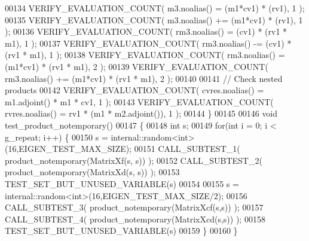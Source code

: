 \begin{DoxyCode}
00134   VERIFY\_EVALUATION\_COUNT( m3.noalias() = (m1*cv1) * (rv1), 1 );
00135   VERIFY\_EVALUATION\_COUNT( m3.noalias() += (m1*cv1) * (rv1), 1 );
00136   VERIFY\_EVALUATION\_COUNT( rm3.noalias() = (cv1) * (rv1 * m1), 1 );
00137   VERIFY\_EVALUATION\_COUNT( rm3.noalias() -= (cv1) * (rv1 * m1), 1 );
00138   VERIFY\_EVALUATION\_COUNT( rm3.noalias() = (m1*cv1) * (rv1 * m1), 2 );
00139   VERIFY\_EVALUATION\_COUNT( rm3.noalias() += (m1*cv1) * (rv1 * m1), 2 );
00140 
00141   \textcolor{comment}{// Check nested products}
00142   VERIFY\_EVALUATION\_COUNT( cvres.noalias() = m1.adjoint() * m1 * cv1, 1 );
00143   VERIFY\_EVALUATION\_COUNT( rvres.noalias() = rv1 * (m1 * m2.adjoint()), 1 );
00144 \}
00145 
00146 \textcolor{keywordtype}{void} test\_product\_notemporary()
00147 \{
00148   \textcolor{keywordtype}{int} s;
00149   \textcolor{keywordflow}{for}(\textcolor{keywordtype}{int} i = 0; i < g\_repeat; i++) \{
00150     s = internal::random<int>(16,EIGEN\_TEST\_MAX\_SIZE);
00151     CALL\_SUBTEST\_1( product\_notemporary(MatrixXf(s, s)) );
00152     CALL\_SUBTEST\_2( product\_notemporary(MatrixXd(s, s)) );
00153     TEST\_SET\_BUT\_UNUSED\_VARIABLE(s)
00154     
00155     s = internal::random<int>(16,EIGEN\_TEST\_MAX\_SIZE/2);
00156     CALL\_SUBTEST\_3( product\_notemporary(MatrixXcf(s,s)) );
00157     CALL\_SUBTEST\_4( product\_notemporary(MatrixXcd(s,s)) );
00158     TEST\_SET\_BUT\_UNUSED\_VARIABLE(s)
00159   \}
00160 \}
\end{DoxyCode}
